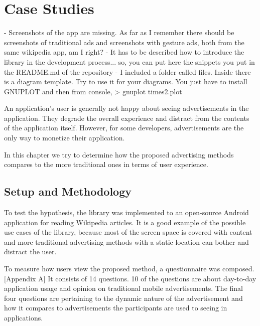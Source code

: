 
\chapter{Case Studies} %


- Screenshots of the app are missing. As far as I remember there should be screenshots of traditional ads and screenshots with gesture ads, both from the same wikipedia app, am I right?
- It has to be described how to introduce the library in the development process... so, you can put here the snippets you put in the README.md of the repository
- I included a folder called files. Inside there is a diagram template. Try to use it for your diagrams. You just have to install GNUPLOT and then from console, > gnuplot times2.plot



An application's user is generally not happy about seeing advertisements in the application. They degrade the overall experience and distract from the contents of the application itself. However, for some developers, advertisements are the only way to monetize their application.

In this chapter we try to determine how the proposed advertising methods compares to the more traditional ones in terms of user experience.

\section{Setup and Methodology}

To test the hypothesis, the library was implemented to an open-source Android application for reading Wikipedia articles. It is a good example of the possible use cases of the library, because most of the screen space is covered with content and more traditional advertising methods with a static location can bother and distract the user.

To measure how users view the proposed method, a questionnaire was composed. [Appendix A] It consists of 14 questions. 10 of the questions are about day-to-day application usage and opinion on traditional mobile advertisements. The final four questions are pertaining to the dynamic nature of the advertisement and how it compares to advertisements the participants are used to seeing in applications.


